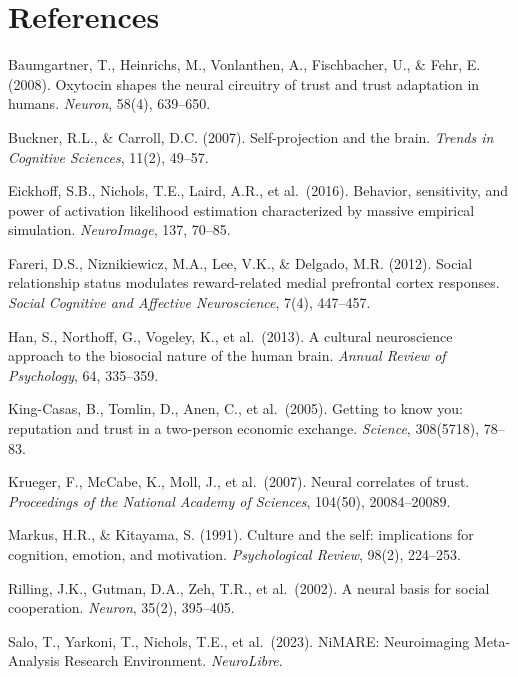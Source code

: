 \documentclass[11pt,a4paper]{report}
\begin{document}
\chapter*{References}

\begin{small}
\noindent
Baumgartner, T., Heinrichs, M., Vonlanthen, A., Fischbacher, U., \& Fehr, E. (2008).
Oxytocin shapes the neural circuitry of trust and trust adaptation in humans.
\textit{Neuron}, 58(4), 639--650.

\medskip\noindent
Buckner, R.L., \& Carroll, D.C. (2007). Self-projection and the brain.
\textit{Trends in Cognitive Sciences}, 11(2), 49--57.

\medskip\noindent
Eickhoff, S.B., Nichols, T.E., Laird, A.R., et al.\ (2016). Behavior, sensitivity, and
power of activation likelihood estimation characterized by massive empirical simulation.
\textit{NeuroImage}, 137, 70--85.

\medskip\noindent
Fareri, D.S., Niznikiewicz, M.A., Lee, V.K., \& Delgado, M.R. (2012). Social relationship
status modulates reward-related medial prefrontal cortex responses.
\textit{Social Cognitive and Affective Neuroscience}, 7(4), 447--457.

\medskip\noindent
Han, S., Northoff, G., Vogeley, K., et al.\ (2013). A cultural neuroscience approach to
the biosocial nature of the human brain.
\textit{Annual Review of Psychology}, 64, 335--359.

\medskip\noindent
King-Casas, B., Tomlin, D., Anen, C., et al.\ (2005). Getting to know you: reputation and
trust in a two-person economic exchange. \textit{Science}, 308(5718), 78--83.

\medskip\noindent
Krueger, F., McCabe, K., Moll, J., et al.\ (2007). Neural correlates of trust.
\textit{Proceedings of the National Academy of Sciences}, 104(50), 20084--20089.

\medskip\noindent
Markus, H.R., \& Kitayama, S. (1991). Culture and the self: implications for cognition,
emotion, and motivation. \textit{Psychological Review}, 98(2), 224--253.

\medskip\noindent
Rilling, J.K., Gutman, D.A., Zeh, T.R., et al.\ (2002). A neural basis for social
cooperation. \textit{Neuron}, 35(2), 395--405.

\medskip\noindent
Salo, T., Yarkoni, T., Nichols, T.E., et al.\ (2023). NiMARE: Neuroimaging Meta-Analysis
Research Environment. \textit{NeuroLibre}.


\end{small}
\end{document}
